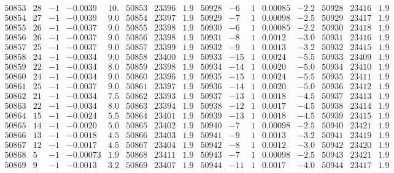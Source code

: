 \documentclass[11pt,reqno,a4letter]{article}
\numberwithin{figure}{section}
\numberwithin{table}{section}
\theoremstyle{plain}
\numberwithin{theorem}{section}
\theoremstyle{definition}
\begin{document}
\begin{table}[ht]
\begin{equation*}
{\begin{array}{ccccc|ccc||ccccc|ccc}
50853 & 28 & -1 & -0.0039 & 10. & 50853 & 23396 & 1.9 & 50928 & -6 & 1 & 0.00085 & -2.2 & 50928 & 23416 & 1.9  \\
50854 & 27 & -1 & -0.0039 & 9.0 & 50854 & 23397 & 1.9 & 50929 & -7 & 1 & 0.00098 & -2.5 & 50929 & 23417 & 1.9  \\
50855 & 26 & -1 & -0.0037 & 9.0 & 50855 & 23398 & 1.9 & 50930 & -6 & 1 & 0.00085 & -2.2 & 50930 & 23418 & 1.9  \\
50856 & 26 & -1 & -0.0037 & 9.0 & 50856 & 23398 & 1.9 & 50931 & -8 & 1 & 0.0012 & -3.0 & 50931 & 23416 & 1.9  \\
50857 & 25 & -1 & -0.0037 & 9.0 & 50857 & 23399 & 1.9 & 50932 & -9 & 1 & 0.0013 & -3.2 & 50932 & 23415 & 1.9  \\
50858 & 24 & -1 & -0.0034 & 9.0 & 50858 & 23400 & 1.9 & 50933 & -15 & 1 & 0.0024 & -5.5 & 50933 & 23409 & 1.9  \\
50859 & 22 & -1 & -0.0034 & 8.0 & 50859 & 23398 & 1.9 & 50934 & -14 & 1 & 0.0020 & -5.0 & 50934 & 23410 & 1.9  \\
50860 & 24 & -1 & -0.0034 & 9.0 & 50860 & 23396 & 1.9 & 50935 & -15 & 1 & 0.0024 & -5.5 & 50935 & 23411 & 1.9  \\
50861 & 25 & -1 & -0.0037 & 9.0 & 50861 & 23397 & 1.9 & 50936 & -14 & 1 & 0.0020 & -5.0 & 50936 & 23412 & 1.9  \\
50862 & 21 & -1 & -0.0034 & 7.5 & 50862 & 23393 & 1.9 & 50937 & -13 & 1 & 0.0018 & -4.5 & 50937 & 23413 & 1.9  \\
50863 & 22 & -1 & -0.0034 & 8.0 & 50863 & 23394 & 1.9 & 50938 & -12 & 1 & 0.0017 & -4.5 & 50938 & 23414 & 1.9  \\
50864 & 15 & -1 & -0.0024 & 5.5 & 50864 & 23401 & 1.9 & 50939 & -13 & 1 & 0.0018 & -4.5 & 50939 & 23415 & 1.9  \\
50865 & 14 & -1 & -0.0020 & 5.0 & 50865 & 23402 & 1.9 & 50940 & -7 & 1 & 0.00098 & -2.5 & 50940 & 23421 & 1.9  \\
50866 & 13 & -1 & -0.0018 & 4.5 & 50866 & 23403 & 1.9 & 50941 & -9 & 1 & 0.0013 & -3.2 & 50941 & 23419 & 1.9  \\
50867 & 12 & -1 & -0.0017 & 4.5 & 50867 & 23404 & 1.9 & 50942 & -8 & 1 & 0.0012 & -3.0 & 50942 & 23420 & 1.9  \\
50868 & 5 & -1 & -0.00073 & 1.9 & 50868 & 23411 & 1.9 & 50943 & -7 & 1 & 0.00098 & -2.5 & 50943 & 23421 & 1.9  \\
50869 & 9 & -1 & -0.0013 & 3.2 & 50869 & 23407 & 1.9 & 50944 & -11 & 1 & 0.0017 & -4.0 & 50944 & 23417 & 1.9  \\

\end{array}}
\end{equation*}
\end{table}
\end{document}
